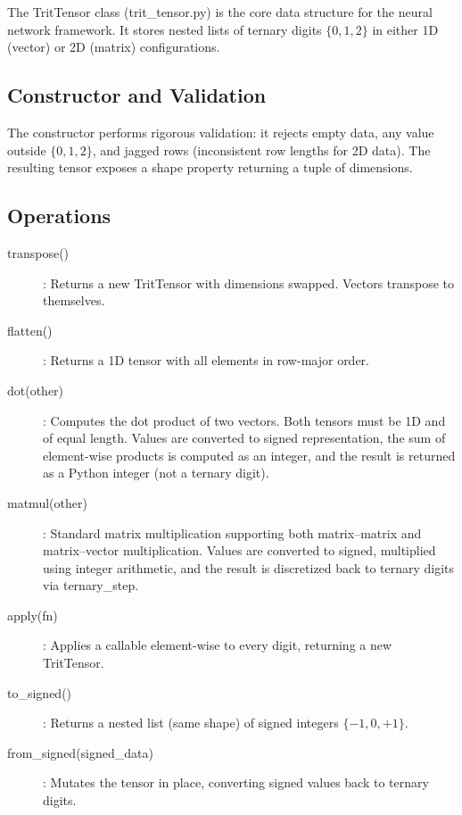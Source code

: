 \documentclass[12pt,a4paper,twoside]{book}
\theoremstyle{trinarytheorem}
\theoremstyle{trinarydefinition}
\newcommand{\code}[1]{\textsf{#1}}
\begin{document}
The \code{TritTensor} class (\code{trit\_tensor.py}) is the core data
structure for the neural network framework. It stores nested lists of
ternary digits $\{0,1,2\}$ in either 1D (vector) or 2D (matrix)
configurations.

\subsection{Constructor and Validation}

The constructor performs rigorous validation: it rejects empty data,
any value outside $\{0,1,2\}$, and jagged rows (inconsistent row lengths
for 2D data). The resulting tensor exposes a \code{shape} property
returning a tuple of dimensions.

\subsection{Operations}

\begin{description}
    \item[\code{transpose()}]: Returns a new \code{TritTensor} with
          dimensions swapped. Vectors transpose to themselves.
    \item[\code{flatten()}]: Returns a 1D tensor with all elements in
          row-major order.
    \item[\code{dot(other)}]: Computes the dot product of two vectors.
          Both tensors must be 1D and of equal length. Values are converted
          to signed representation, the sum of element-wise products is
          computed as an integer, and the result is returned as a Python
          integer (not a ternary digit).
    \item[\code{matmul(other)}]: Standard matrix multiplication supporting
          both matrix--matrix and matrix--vector multiplication. Values
          are converted to signed, multiplied using integer arithmetic,
          and the result is discretized back to ternary digits via
          \code{ternary\_step}.
    \item[\code{apply(fn)}]: Applies a callable element-wise to every
          digit, returning a new \code{TritTensor}.
    \item[\code{to\_signed()}]: Returns a nested list (same shape) of
          signed integers $\{-1,0,+1\}$.
    \item[\code{from\_signed(signed\_data)}]: Mutates the tensor in
          place, converting signed values back to ternary digits.
\end{description}
\end{document}
